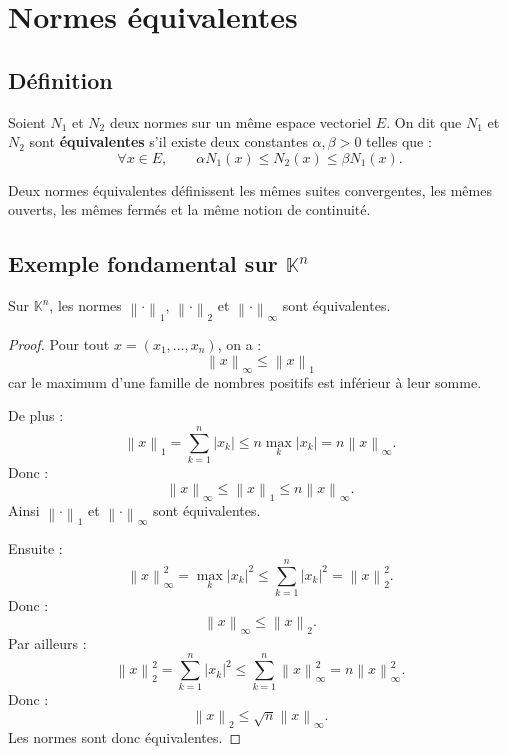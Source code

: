 \documentclass[11pt,a4paper]{article}
\newcommand{\K}{\mathbb K}
\newcommand{\norme}[1]{\left\lVert #1 \right\rVert}
\begin{document}
\section{Normes équivalentes}

\subsection{Définition}

\begin{definitionbox}
Soient \(N_1\) et \(N_2\) deux normes sur un même espace vectoriel \(E\).  
On dit que \(N_1\) et \(N_2\) sont \textbf{équivalentes} s'il existe deux constantes \(\alpha,\beta>0\) telles que :
\[
\forall x\in E,\qquad
\alpha N_1(x)\leq N_2(x)\leq \beta N_1(x).
\]
\end{definitionbox}

\begin{retenirbox}
Deux normes équivalentes définissent les mêmes suites convergentes, les mêmes ouverts, les mêmes fermés et la même notion de continuité.
\end{retenirbox}

\subsection{Exemple fondamental sur \(\K^n\)}

\begin{theorembox}
Sur \(\K^n\), les normes \(\norme{\cdot}_1\), \(\norme{\cdot}_2\) et \(\norme{\cdot}_\infty\) sont équivalentes.
\end{theorembox}

\begin{proof}
Pour tout \(x=(x_1,\dots,x_n)\), on a :
\[
\norme{x}_\infty\leq \norme{x}_1
\]
car le maximum d'une famille de nombres positifs est inférieur à leur somme.

De plus :
\[
\norme{x}_1=\sum_{k=1}^n |x_k|
\leq n\max_k |x_k|
=n\norme{x}_\infty.
\]
Donc :
\[
\norme{x}_\infty\leq \norme{x}_1\leq n\norme{x}_\infty.
\]
Ainsi \(\norme{\cdot}_1\) et \(\norme{\cdot}_\infty\) sont équivalentes.

Ensuite :
\[
\norme{x}_\infty^2
=\max_k |x_k|^2
\leq \sum_{k=1}^n |x_k|^2
=\norme{x}_2^2.
\]
Donc :
\[
\norme{x}_\infty\leq \norme{x}_2.
\]
Par ailleurs :
\[
\norme{x}_2^2=\sum_{k=1}^n |x_k|^2
\leq \sum_{k=1}^n \norme{x}_\infty^2
=n\norme{x}_\infty^2.
\]
Donc :
\[
\norme{x}_2\leq \sqrt n\norme{x}_\infty.
\]
Les normes sont donc équivalentes.
\end{proof}
\end{document}
